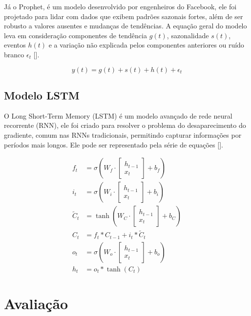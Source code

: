 \documentclass[12pt]{article}
\begin{document}
Já o Prophet, é um modelo desenvolvido por engenheiros do Facebook, ele foi projetado para lidar com dados que exibem padrões sazonais fortes, além de ser robusto a valores ausentes e mudanças de tendências. A equação geral do modelo leva em consideração componentes de tendência \( g(t) \), sazonalidade \( s(t) \), eventos \( h(t) \) e a variação não explicada pelos componentes anteriores ou ruído branco \( \epsilon_t \) [\cite{taylor_forecasting_2017}].

\[
y(t) = g(t) + s(t) + h(t) + \epsilon_t
\]

\subsection{Modelo LSTM}

O Long Short-Term Memory (LSTM) é um modelo avançado de rede neural recorrente (RNN), ele foi criado para resolver o problema do desaparecimento do gradiente, comum nas RNNs tradicionais, permitindo capturar informações por períodos mais longos. Ele pode ser representado pela série de equações [\cite{zamanzadeh_darban_deep_2025}].

\[
\begin{aligned}
f_t &= \sigma\left(W_f \cdot \begin{bmatrix} h_{t-1} \\ x_t \end{bmatrix} + b_f\right) \\
i_t &= \sigma\left(W_i \cdot \begin{bmatrix} h_{t-1} \\ x_t \end{bmatrix} + b_i\right) \\
\tilde{C}_t &= \tanh\left(W_C \cdot \begin{bmatrix} h_{t-1} \\ x_t \end{bmatrix} + b_C\right) \\
C_t &= f_t \ast C_{t-1} + i_t \ast \tilde{C}_t \\
o_t &= \sigma\left(W_o \cdot \begin{bmatrix} h_{t-1} \\ x_t \end{bmatrix} + b_o\right) \\
h_t &= o_t \ast \tanh(C_t)
\end{aligned}
\]

\section{Avaliação}
\end{document}
